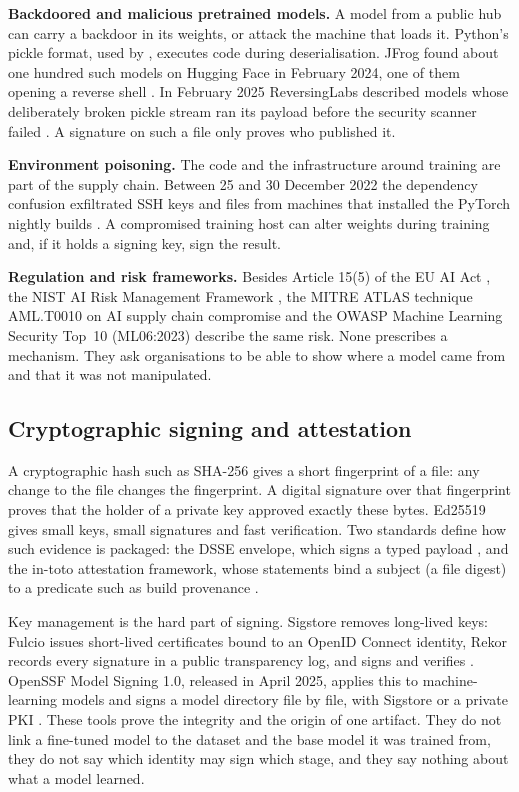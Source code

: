 \textbf{Backdoored and malicious pretrained models.} A model from a public hub can carry a backdoor in its
weights, or attack the machine that loads it. Python's pickle format, used by , executes code
during deserialisation. JFrog found about one hundred such models on Hugging Face in February 2024, one of them
opening a reverse shell \cite{jfrog2024}. In February 2025 ReversingLabs described models whose deliberately
broken pickle stream ran its payload before the security scanner failed \cite{rl2025}. A signature on such a
file only proves who published it.

\textbf{Environment poisoning.} The code and the infrastructure around training are part of the supply chain.
Between 25 and 30 December 2022 the  dependency confusion exfiltrated SSH keys and files from
machines that installed the PyTorch nightly builds \cite{pytorch2022}. A compromised training host can alter
weights during training and, if it holds a signing key, sign the result.

\textbf{Regulation and risk frameworks.} Besides Article 15(5) of the EU AI Act \cite{aiact2024}, the NIST AI
Risk Management Framework \cite{nistairmf}, the MITRE ATLAS technique AML.T0010 on AI supply chain compromise
\cite{atlas} and the OWASP Machine Learning Security Top~10 (ML06:2023) \cite{owaspml} describe the same risk.
None prescribes a mechanism. They ask organisations to be able to show where a model came from and that it was
not manipulated.

\subsection{Cryptographic signing and attestation}
A cryptographic hash such as SHA-256 gives a short fingerprint of a file: any change to the file changes the
fingerprint. A digital signature over that fingerprint proves that the holder of a private key approved exactly
these bytes. Ed25519 \cite{rfc8032} gives small keys, small signatures and fast verification. Two standards
define how such evidence is packaged: the DSSE envelope, which signs a typed payload \cite{dsse}, and the in-toto
attestation framework, whose statements bind a subject (a file digest) to a predicate such as build provenance
\cite{intotoattest}.

Key management is the hard part of signing. Sigstore removes long-lived keys: Fulcio issues short-lived
certificates bound to an OpenID Connect identity, Rekor records every signature in a public transparency log,
and  signs and verifies \cite{sigstore2022}. OpenSSF Model Signing 1.0, released in April 2025,
applies this to machine-learning models and signs a model directory file by file, with Sigstore or a private
PKI \cite{oms2025}. These tools prove the integrity and the origin of one artifact. They do not link a fine-tuned
model to the dataset and the base model it was trained from, they do not say which identity may sign which
stage, and they say nothing about what a model learned.

